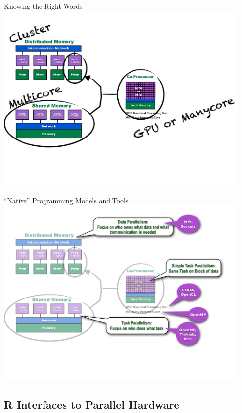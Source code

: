 \begin{frame}
\begin{block}{Knowing the Right Words}
    \includegraphics[width=0.95\textwidth]{../common/pics/ParallelHardware5.pdf}
\end{block}
\end{frame}

\begin{frame}
\begin{block}{``Native'' Programming Models and Tools}
    \includegraphics[width=0.95\textwidth]{../common/pics/ParallelHardware6.pdf}
\end{block}
\end{frame}

\subsection{R Interfaces to Parallel Hardware}

